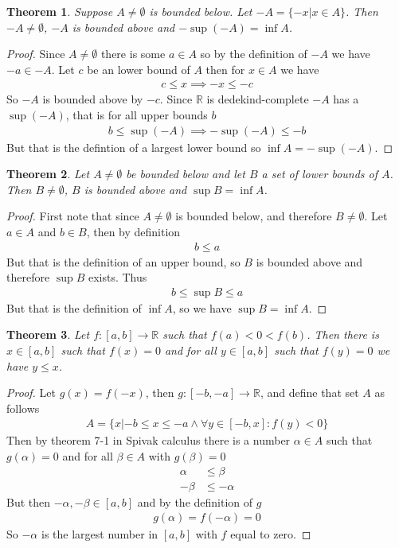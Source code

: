 \documentclass{article}
\newtheorem{theorem}{Theorem}[section]
\begin{document}
\begin{theorem}
	Suppose $A \neq \emptyset$ is bounded below. Let $-A = \{-x|x\in A\}$. Then
	$-A \neq \emptyset$, $-A$ is bounded above and $-\sup(-A) = \inf A$.
\end{theorem}
\begin{proof}
	Since $A \neq \emptyset$ there is some $a \in A$ so by the definition of
	$-A$ we have $-a \in -A$. Let $c$ be an lower bound of $A$ then for $x \in
	A$ we have
	\begin{align*}
		c \leq x \implies -x \leq -c
	\end{align*}
	So $-A$ is bounded above by $-c$. Since $\mathbb{R}$ is dedekind-complete
	$-A$ has a $\sup(-A)$, that is for all upper bounds $b$
	\begin{align*}
		b \leq \sup(-A) \implies -\sup(-A) \leq -b
	\end{align*}
	But that is the defintion of a largest lower bound so $\inf A = -\sup(-A)$.
\end{proof}
\begin{theorem}
	Let $A \neq \emptyset$ be bounded below and let $B$ a set of lower bounds of
	$A$. Then $B \neq \emptyset$, $B$ is bounded above and $\sup B = \inf
	A$.
\end{theorem}
\begin{proof}
	First note that since $A \neq \emptyset$ is bounded below, and therefore $B
	\neq \emptyset$. Let $a \in A$ and $b \in B$, then by definition
	\begin{align*}
		b \leq a
	\end{align*}
	But that is the definition of an upper bound, so $B$ is bounded above and
	therefore $\sup B$ exists. Thus
	\begin{align*}
		b \leq \sup B \leq a
	\end{align*}
	But that is the definition of $\inf A$, so we have $\sup B = \inf A$.
\end{proof}
\begin{theorem}
	Let $f: [a,b] \rightarrow \mathbb{R}$ such that $f(a) < 0 < f(b)$. Then
	there is $x \in [a,b]$ such that $f(x)=0$ and for all $y \in [a,b]$ such
	that $f(y)=0$ we have $y \leq x$.
\end{theorem}
\begin{proof}
	Let $g(x) = f(-x)$, then $g: [-b,-a] \rightarrow \mathbb{R}$,
	and define that set $A$ as follows
	\begin{align*}
		A = \{x|-b \leq x \leq -a \land \forall y \in [-b,x]: f(y)<0\}
	\end{align*}
	Then by theorem 7-1 in Spivak calculus there is a number $\alpha \in A$ such
	that $g(\alpha)=0$ and for all $\beta \in A$ with $g(\beta) = 0$
	\begin{align*}
		\alpha &\leq \beta \\
		-\beta &\leq -\alpha
	\end{align*}
	But then $-\alpha,-\beta \in [a,b]$ and by the definition of $g$
	\begin{align*}
		g(\alpha) = f(-\alpha) = 0
	\end{align*}
	So $-\alpha$ is the largest number in $[a,b]$ with $f$ equal to zero.
\end{proof}
\end{document}
